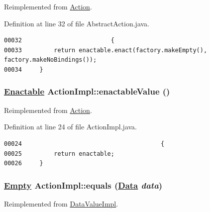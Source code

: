 Reimplemented from \hyperlink{interfaceAction_a1}{Action}.

Definition at line 32 of file Abstract\-Action.java.\footnotesize\begin{verbatim}00032                         {
00033         return enactable.enact(factory.makeEmpty(), factory.makeNoBindings());
00034     }   
\end{verbatim}\normalsize 
\hypertarget{classActionImpl_a10}{
\subsubsection[enactableValue]{\setlength{\rightskip}{0pt plus 5cm}\hyperlink{interfaceEnactable}{Enactable} Action\-Impl::enactable\-Value ()}}
\label{classActionImpl_a10}




Reimplemented from \hyperlink{interfaceAction_a0}{Action}.

Definition at line 24 of file Action\-Impl.java.\footnotesize\begin{verbatim}00024                                       {
00025         return enactable;
00026     }
\end{verbatim}\normalsize 
\hypertarget{classActionImpl_a21}{
\subsubsection[equals]{\setlength{\rightskip}{0pt plus 5cm}\hyperlink{interfaceEmpty}{Empty} Action\-Impl::equals (\hyperlink{interfaceData}{Data} {\em data})}}
\label{classActionImpl_a21}




Reimplemented from \hyperlink{classDataValueImpl_a5}{Data\-Value\-Impl}.

